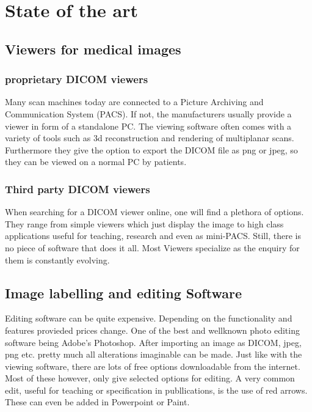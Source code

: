 
\chapter{State of the art}
  \label{SOTA}
\section{Viewers for medical images}
\subsection{proprietary DICOM viewers}
Many scan machines today are connected to a Picture Archiving and Communication System (PACS). If not, the manufacturers usually provide a viewer in form of a standalone PC. The viewing software often comes with a variety of tools such as 3d reconstruction and rendering of multiplanar scans. Furthermore they give the option to export the DICOM file as png or jpeg, so they can be viewed on a normal PC by patients. \cite{ElsevierEnhancedReader}

\subsection{Third party DICOM viewers}
\label{Third party DICOM viewers}
When searching for a DICOM viewer online, one will find a plethora of options. They range from simple viewers which just display the image to high class applications useful for teaching, research and even as mini-PACS. Still, there is no piece of software that does it all. Most Viewers specialize as the enquiry for them is constantly evolving.
\cite{varmaFreeDICOMBrowsers2008}


\section{Image labelling  and editing Software}
\label{Image labelling and editing Software}
Editing software can be quite expensive. Depending on the functionality and features provieded prices change. One of the best and wellknown photo editing software being Adobe's Photoshop. After importing an image as DICOM, jpeg, png etc. pretty much all alterations imaginable can be made. Just like with the viewing software, there are lots of free options downloadable from the internet. Most of these however, only give selected options for editing.
A very common edit, useful for teaching or specification in publlications, is the use of red arrows. These can even be added in Powerpoint or Paint.

